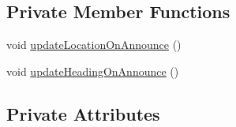 \subsection*{Private Member Functions}
\begin{DoxyCompactItemize}
\item 
void \hyperlink{classpt_1_1lsts_1_1asa_1_1comms_1_1Announcer_a7826694b7d80ba969a9b35f11959a142}{update\+Location\+On\+Announce} ()
\item 
void \hyperlink{classpt_1_1lsts_1_1asa_1_1comms_1_1Announcer_a34cc1070a50e7a229ea0349111dce02b}{update\+Heading\+On\+Announce} ()
\end{DoxyCompactItemize}
\subsection*{Private Attributes}
